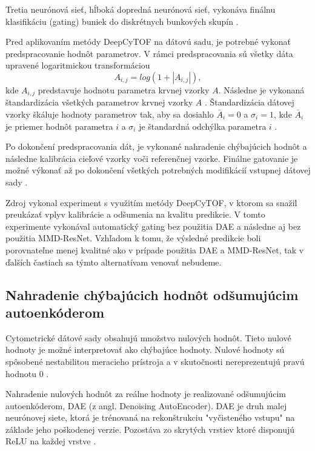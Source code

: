 Tretia neurónová sieť, hĺboká dopredná neurónová sieť, vykonáva finálnu klasifikáciu (gating) buniek do diskrétnych bunkových skupín \cite{Li2017}.

Pred aplikovaním metódy DeepCyTOF na dátovú sadu, je potrebné vykonať predspracovanie hodnôt parametrov. V rámci predspracovania sú všetky dáta upravené logaritmickou transformáciou
\begin{equation}
    A_{i,j} = log(1+|A_{i,j}|),
\end{equation}
kde $A_{i,j}$ predstavuje hodnotu parametra krvnej vzorky $A$. Následne je vykonaná štandardizácia všetkých parametrov krvnej vzorky $A$ \cite{Li2016, Li2017}. Štandardizácia dátovej vzorky škáluje hodnoty parametrov tak, aby sa dosiahlo $\bar{A}_i=0$ a $\sigma_i=1$, kde $\bar{A}_i$ je priemer hodnôt parametra $i$ a $\sigma_i$ je štandardná odchýlka parametra $i$ \cite{Aksoy}.

Po dokončení predspracovania dát, je vykonané nahradenie chýbajúcich hodnôt a následne kalibrácia cieľové vzorky voči referenčnej vzorke. Finálne gatovanie je možné výkonať až po dokončení všetkých potrebných modifikácií vstupnej dátovej sady \cite{Li2017}. 

Zdroj \cite{Li2017} vykonal experiment s využitím metódy DeepCyTOF, v ktorom sa snažil preukázať vplyv kalibrácie a odšumenia na kvalitu predikcie. V tomto experimente vykonával automatický gating bez použitia DAE a následne aj bez použitia MMD-ResNet. Vzhľadom k tomu, že výsledné predikcie boli porovnateľne menej kvalitné ako v prípade použitia DAE a MMD-ResNet, tak v ďalších častiach sa týmto alternatívam venovať nebudeme.

\subsection{Nahradenie chýbajúcich hodnôt odšumujúcim autoenkóderom}

Cytometrické dátové sady obsahujú množstvo nulových hodnôt. Tieto nulové hodnoty je možné interpretovať ako chýbajúce hodnoty. Nulové hodnoty sú spôsobené nestabilitou meracieho prístroja a v skutočnosti nereprezentujú pravú hodnotu 0 \cite{Li2017}.

Nahradenie nulových hodnôt za reálne hodnoty je realizované odšumujúcim autoenkóderom, DAE (z angl. Denoising AutoEncoder). DAE je druh malej neurónovej siete, ktorá je trénovaná na rekonštrukciu "vyčisteného vstupu" na základe jeho poškodenej verzie. Pozostáva zo skrytých vrstiev ktoré disponujú ReLU na každej vrstve \cite{Li2017}.

